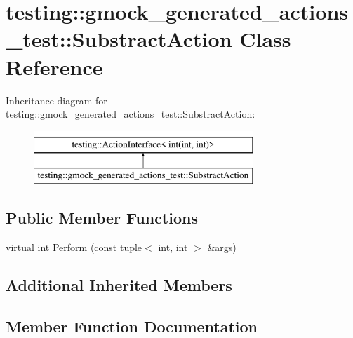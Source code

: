 \hypertarget{classtesting_1_1gmock__generated__actions__test_1_1SubstractAction}{}\section{testing\+::gmock\+\_\+generated\+\_\+actions\+\_\+test\+::Substract\+Action Class Reference}
\label{classtesting_1_1gmock__generated__actions__test_1_1SubstractAction}
Inheritance diagram for testing\+::gmock\+\_\+generated\+\_\+actions\+\_\+test\+::Substract\+Action\+:\begin{figure}[H]
\begin{center}
\leavevmode
\includegraphics[height=2.000000cm]{classtesting_1_1gmock__generated__actions__test_1_1SubstractAction}
\end{center}
\end{figure}
\subsection*{Public Member Functions}
\begin{DoxyCompactItemize}
\item 
virtual int \mbox{\hyperlink{classtesting_1_1gmock__generated__actions__test_1_1SubstractAction_ac049ec6196668e17ef7384e08914f2c3}{Perform}} (const tuple$<$ int, int $>$ \&args)
\end{DoxyCompactItemize}
\subsection*{Additional Inherited Members}


\subsection{Member Function Documentation}
\mbox{\label{classtesting_1_1gmock__generated__actions__test_1_1SubstractAction_ac049ec6196668e17ef7384e08914f2c3}} 
